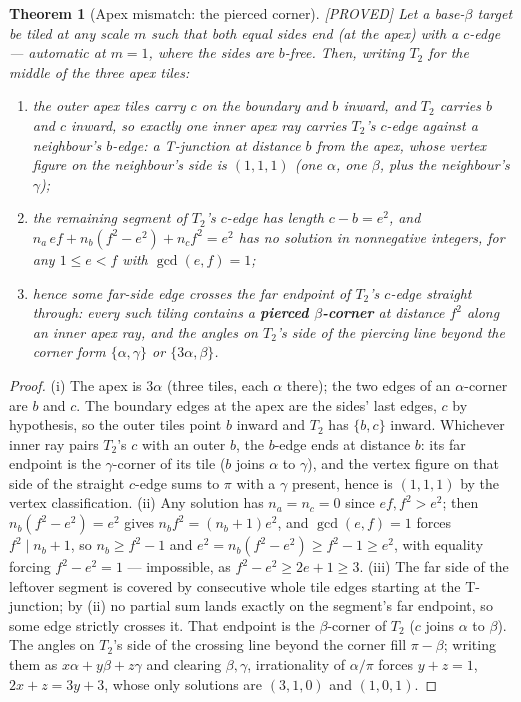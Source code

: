 \documentclass[11pt,reqno]{amsart}
\theoremstyle{plain}
\newtheorem{theorem}{Theorem}
\theoremstyle{definition}
\newcommand{\lab}[1]{\hfill\textnormal{\footnotesize\textsc{[#1]}}}
\begin{document}
\begin{theorem}[Apex mismatch: the pierced corner]\label{thm:pierce}\lab{PROVED}
Let a base-$\beta$ target be tiled at any scale $m$ such that both equal sides end (at the apex) with
a $c$-edge --- automatic at $m=1$, where the sides are $b$-free. Then, writing $T_2$ for the middle
of the three apex tiles:
\begin{enumerate}
\item[\textup{(i)}] the outer apex tiles carry $c$ on the boundary and $b$ inward, and $T_2$ carries
$b$ and $c$ inward, so exactly one inner apex ray carries $T_2$'s $c$-edge against a neighbour's
$b$-edge: a T-junction at distance $b$ from the apex, whose vertex figure on the neighbour's side is
$(1,1,1)$ (one $\alpha$, one $\beta$, plus the neighbour's $\gamma$);
\item[\textup{(ii)}] the remaining segment of $T_2$'s $c$-edge has length $c-b=e^2$, and
$n_a\,ef+n_b(f^2-e^2)+n_c f^2=e^2$ has \emph{no} solution in nonnegative integers, for any
$1\le e<f$ with $\gcd(e,f)=1$;
\item[\textup{(iii)}] hence some far-side edge crosses the far endpoint of $T_2$'s $c$-edge
\emph{straight through}: every such tiling contains a \textbf{pierced $\beta$-corner} at distance
$f^2$ along an inner apex ray, and the angles on $T_2$'s side of the piercing line beyond the corner
form $\{\alpha,\gamma\}$ or $\{3\alpha,\beta\}$.
\end{enumerate}
\end{theorem}

\begin{proof}
(i) The apex is $3\alpha$ (three tiles, each $\alpha$ there); the two edges of an $\alpha$-corner are
$b$ and $c$. The boundary edges at the apex are the sides' last edges, $c$ by hypothesis, so the outer
tiles point $b$ inward and $T_2$ has $\{b,c\}$ inward. Whichever inner ray pairs $T_2$'s $c$ with an
outer $b$, the $b$-edge ends at distance $b$: its far endpoint is the $\gamma$-corner of its tile
($b$ joins $\alpha$ to $\gamma$), and the vertex figure on that side of the straight $c$-edge sums to
$\pi$ with a $\gamma$ present, hence is $(1,1,1)$ by the vertex classification. (ii) Any solution has
$n_a=n_c=0$ since $ef,f^2>e^2$; then $n_b(f^2-e^2)=e^2$ gives $n_b f^2=(n_b+1)e^2$, and
$\gcd(e,f)=1$ forces $f^2\mid n_b+1$, so $n_b\ge f^2-1$ and
$e^2=n_b(f^2-e^2)\ge f^2-1\ge e^2$, with equality forcing $f^2-e^2=1$ --- impossible, as
$f^2-e^2\ge 2e+1\ge 3$. (iii) The far side of the leftover segment is covered by consecutive whole
tile edges starting at the T-junction; by (ii) no partial sum lands exactly on the segment's far
endpoint, so some edge strictly crosses it. That endpoint is the $\beta$-corner of $T_2$ ($c$ joins
$\alpha$ to $\beta$). The angles on $T_2$'s side of the crossing line beyond the corner fill
$\pi-\beta$; writing them as $x\alpha+y\beta+z\gamma$ and clearing $\beta,\gamma$, irrationality of
$\alpha/\pi$ forces $y+z=1$, $2x+z=3y+3$, whose only solutions are $(3,1,0)$ and $(1,0,1)$.
\end{proof}
\end{document}
